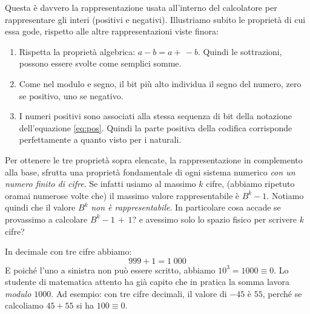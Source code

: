 Questa è davvero la rappresentazione usata all'interno del calcolatore per
rappresentare gli interi (positivi e negativi). Illustriamo subito le proprietà
di cui essa gode, rispetto alle altre rappresentazioni viste finora:
\begin{enumerate}
	\item Rispetta la proprietà algebrica:  $a - b = a +\, -b$. Quindi le sottrazioni, possono essere svolte come semplici somme.
	\item Come nel modulo e segno, il bit più alto individua il segno del numero, zero se positivo, uno se negativo.
	\item I numeri positivi sono associati alla stessa sequenza di bit della notazione dell'equazione \eqref{eq:pos}. Quindi la parte positiva della
	codifica corrisponde perfettamente a quanto visto per i naturali.
\end{enumerate}

Per ottenere le tre proprietà sopra elencate, la 
rappresentazione in complemento alla base, sfrutta una proprietà fondamentale
di ogni sistema numerico \emph{con un numero finito di cifre}. Se infatti usiamo al massimo $k$ cifre, (abbiamo ripetuto oramai numerose volte che) il massimo valore rappresentabile è $B^k-1$. Notiamo quindi che il valore
$B^k$ \emph{non è rappresentabile}. In particolare cosa accade se provassimo a calcolare $B^k-1\,+\,1$? e avessimo solo lo spazio fisico per scrivere $k$ cifre?

\begin{ex} In decimale con tre cifre abbiamo:
	\[ \boxed{9}\boxed{9}\boxed{9} + 1 = 1\;\boxed{0}\boxed{0}\boxed{0} \]
E poiché l'uno a sinistra non può essere scritto, abbiamo $10^3 = 1000 \equiv 0$. Lo studente di matematica attento ha già capito che in pratica la somma lavora \emph{modulo $1000$}. Ad esempio: con tre cifre decimali, il valore di $-45$ è $55$, perché se calcoliamo $45 + 55$ si ha $100 \equiv 0$.
\end{ex}


